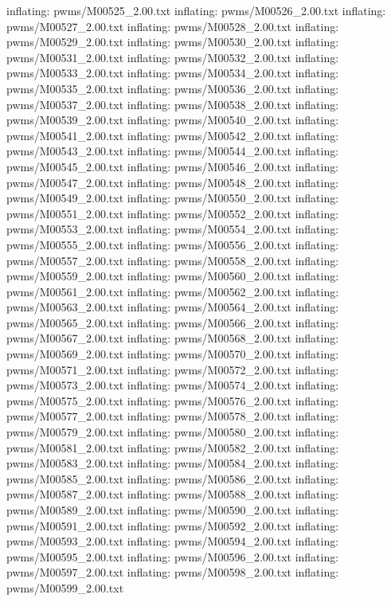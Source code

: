 \documentclass[letterpaper,10pt,english]{sphinxmanual}
\begin{document}
{\begin{sphinxVerbatim}[commandchars=\\\{\}]
  inflating: pwms/M00525\_2.00.txt
  inflating: pwms/M00526\_2.00.txt
  inflating: pwms/M00527\_2.00.txt
  inflating: pwms/M00528\_2.00.txt
  inflating: pwms/M00529\_2.00.txt
  inflating: pwms/M00530\_2.00.txt
  inflating: pwms/M00531\_2.00.txt
  inflating: pwms/M00532\_2.00.txt
  inflating: pwms/M00533\_2.00.txt
  inflating: pwms/M00534\_2.00.txt
  inflating: pwms/M00535\_2.00.txt
  inflating: pwms/M00536\_2.00.txt
  inflating: pwms/M00537\_2.00.txt
  inflating: pwms/M00538\_2.00.txt
  inflating: pwms/M00539\_2.00.txt
  inflating: pwms/M00540\_2.00.txt
  inflating: pwms/M00541\_2.00.txt
  inflating: pwms/M00542\_2.00.txt
  inflating: pwms/M00543\_2.00.txt
  inflating: pwms/M00544\_2.00.txt
  inflating: pwms/M00545\_2.00.txt
  inflating: pwms/M00546\_2.00.txt
  inflating: pwms/M00547\_2.00.txt
  inflating: pwms/M00548\_2.00.txt
  inflating: pwms/M00549\_2.00.txt
  inflating: pwms/M00550\_2.00.txt
  inflating: pwms/M00551\_2.00.txt
  inflating: pwms/M00552\_2.00.txt
  inflating: pwms/M00553\_2.00.txt
  inflating: pwms/M00554\_2.00.txt
  inflating: pwms/M00555\_2.00.txt
  inflating: pwms/M00556\_2.00.txt
  inflating: pwms/M00557\_2.00.txt
  inflating: pwms/M00558\_2.00.txt
  inflating: pwms/M00559\_2.00.txt
  inflating: pwms/M00560\_2.00.txt
  inflating: pwms/M00561\_2.00.txt
  inflating: pwms/M00562\_2.00.txt
  inflating: pwms/M00563\_2.00.txt
  inflating: pwms/M00564\_2.00.txt
  inflating: pwms/M00565\_2.00.txt
  inflating: pwms/M00566\_2.00.txt
  inflating: pwms/M00567\_2.00.txt
  inflating: pwms/M00568\_2.00.txt
  inflating: pwms/M00569\_2.00.txt
  inflating: pwms/M00570\_2.00.txt
  inflating: pwms/M00571\_2.00.txt
  inflating: pwms/M00572\_2.00.txt
  inflating: pwms/M00573\_2.00.txt
  inflating: pwms/M00574\_2.00.txt
  inflating: pwms/M00575\_2.00.txt
  inflating: pwms/M00576\_2.00.txt
  inflating: pwms/M00577\_2.00.txt
  inflating: pwms/M00578\_2.00.txt
  inflating: pwms/M00579\_2.00.txt
  inflating: pwms/M00580\_2.00.txt
  inflating: pwms/M00581\_2.00.txt
  inflating: pwms/M00582\_2.00.txt
  inflating: pwms/M00583\_2.00.txt
  inflating: pwms/M00584\_2.00.txt
  inflating: pwms/M00585\_2.00.txt
  inflating: pwms/M00586\_2.00.txt
  inflating: pwms/M00587\_2.00.txt
  inflating: pwms/M00588\_2.00.txt
  inflating: pwms/M00589\_2.00.txt
  inflating: pwms/M00590\_2.00.txt
  inflating: pwms/M00591\_2.00.txt
  inflating: pwms/M00592\_2.00.txt
  inflating: pwms/M00593\_2.00.txt
  inflating: pwms/M00594\_2.00.txt
  inflating: pwms/M00595\_2.00.txt
  inflating: pwms/M00596\_2.00.txt
  inflating: pwms/M00597\_2.00.txt
  inflating: pwms/M00598\_2.00.txt
  inflating: pwms/M00599\_2.00.txt

\end{sphinxVerbatim}}
\end{document}
